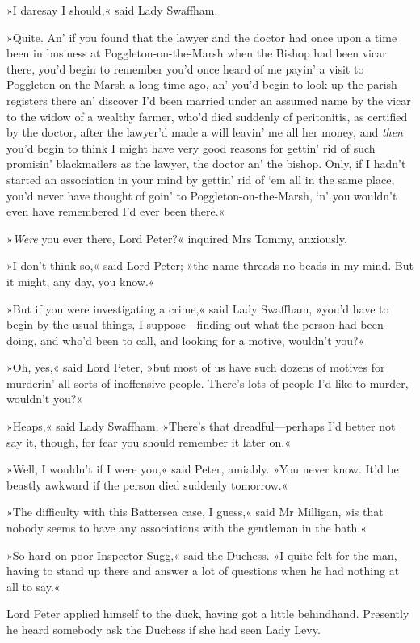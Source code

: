 »I daresay I should,« said Lady Swaffham.

»Quite. An' if you found that the lawyer and the doctor had once upon a time been in business at Poggleton-on-the-Marsh when the Bishop had been vicar there, you'd begin to remember you'd once heard of me payin' a visit to Poggleton-on-the-Marsh a long time ago, an' you'd begin to look up the parish registers there an' discover I'd been married under an assumed name by the vicar to the widow of a wealthy farmer, who'd died suddenly of peritonitis, as certified by the doctor, after the lawyer'd made a will leavin' me all her money, and \textit{then} you'd begin to think I might have very good reasons for gettin' rid of such promisin' blackmailers as the lawyer, the doctor an' the bishop. Only, if I hadn't started an association in your mind by gettin' rid of `em all in the same place, you'd never have thought of goin' to Poggleton-on-the-Marsh, `n' you wouldn't even have remembered I'd ever been there.«

»\textit{Were} you ever there, Lord Peter?« inquired Mrs Tommy, anxiously.

»I don't think so,« said Lord Peter; »the name threads no beads in my mind. But it might, any day, you know.«

»But if you were investigating a crime,« said Lady Swaffham, »you'd have to begin by the usual things, I suppose—finding out what the person had been doing, and who'd been to call, and looking for a motive, wouldn't you?«

»Oh, yes,« said Lord Peter, »but most of us have such dozens of motives for murderin' all sorts of inoffensive people. There's lots of people I'd like to murder, wouldn't you?«

»Heaps,« said Lady Swaffham. »There's that dreadful—perhaps I'd better not say it, though, for fear you should remember it later on.«

»Well, I wouldn't if I were you,« said Peter, amiably. »You never know. It'd be beastly awkward if the person died suddenly tomorrow.«

»The difficulty with this Battersea case, I guess,« said Mr Milligan, »is that nobody seems to have any associations with the gentleman in the bath.«

»So hard on poor Inspector Sugg,« said the Duchess. »I quite felt for the man, having to stand up there and answer a lot of questions when he had nothing at all to say.«

Lord Peter applied himself to the duck, having got a little behindhand. Presently he heard somebody ask the Duchess if she had seen Lady Levy.

